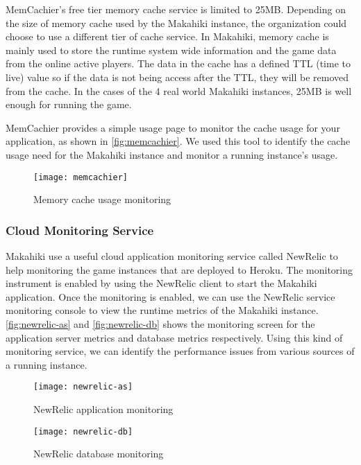 MemCachier's free tier memory cache service is limited to 25MB. Depending on the size of memory cache used by the Makahiki instance, the organization could choose to use a different tier of cache service. In Makahiki, memory cache is mainly used to store the runtime system wide information and the game data from the online active players. The data in the cache has a defined TTL (time to live) value so if the data is not being access after the TTL, they will be removed from the cache. In the cases of the 4 real world Makahiki instances, 25MB is well enough for running the game.

MemCachier provides a simple usage page to monitor the cache usage for your application, as shown in \autoref{fig:memcachier}. We used this tool to identify the cache usage need for the Makahiki instance and monitor a running instance's usage.

\begin{figure}[ht!]
  \center
  \texttt{[image: memcachier]}
  \caption{Memory cache usage monitoring}
  \label{fig:memcachier}
\end{figure}

\subsubsection{Cloud Monitoring Service}

Makahiki use a useful cloud application monitoring service called NewRelic to help monitoring the game instances that are deployed to Heroku. The monitoring instrument is enabled by using the NewRelic client to start the Makahiki application. Once the monitoring is enabled, we can use the NewRelic service monitoring console to view the runtime metrics of the Makahiki instance. \autoref{fig:newrelic-as} and \autoref{fig:newrelic-db} shows the monitoring screen for the application server metrics and database metrics respectively. Using this kind of monitoring service, we can identify the performance issues from various sources of a running instance.

\begin{figure}[ht!]
  \center
  \texttt{[image: newrelic-as]}
  \caption{NewRelic application monitoring}
  \label{fig:newrelic-as}
\end{figure}

\begin{figure}[ht!]
  \center
  \texttt{[image: newrelic-db]}
  \caption{NewRelic database monitoring}
  \label{fig:newrelic-db}
\end{figure}

